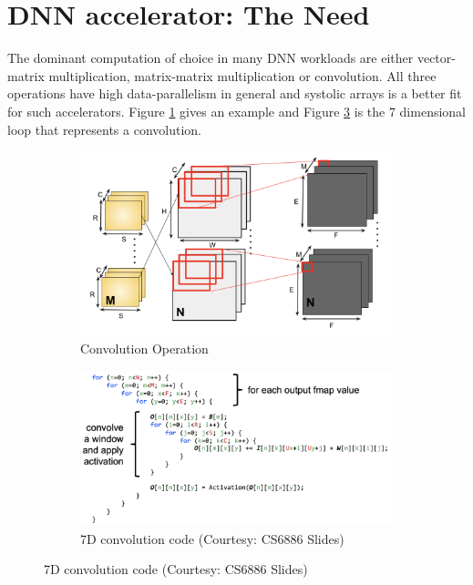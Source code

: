 \section{DNN accelerator: The Need}

The dominant computation of choice in many DNN workloads are either vector-matrix multiplication, matrix-matrix multiplication or convolution. All three operations have high data-parallelism in general and systolic arrays is a better fit for such accelerators. Figure \ref{fig:conv} gives an example and Figure \ref{fig:convcode} is the 7 dimensional loop that represents a convolution.

\begin{figure}[h]
    \centering
    \begin{subfigure}{0.5\textwidth}
        \centering
        \includegraphics[width=\linewidth]{images/convEx.png}
        \caption{Convolution Operation}
        \label{fig:conv}
    \end{subfigure}%
    \begin{subfigure}{0.5\textwidth}
        \centering 
        \includegraphics[width=\linewidth]{images/convCode.png}
        \caption{7D convolution code (Courtesy: CS6886 Slides)}
        \label{fig:convcode}
    \end{subfigure}

\end{figure}

